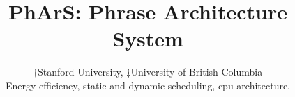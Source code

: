 \documentclass[9pt,journal,letterpaper,compsoc]{IEEEtran}
\begin{document}
\title{PhArS: Phrase Architecture System}


\author{%

$\dagger$Stanford University, $\ddagger$University of British Columbia


{\justifying
\begin{abstract} 
\end{abstract}
\par}

\begin{keywords}
Energy efficiency, static and dynamic scheduling, cpu architecture.
\end{keywords}}
\maketitle
\IEEEdisplaynotcompsoctitleabstractindextext
\IEEEpeerreviewmaketitle
\thispagestyle{empty}
\pagestyle{empty}




\vspace{-2mm}
\nocite{ref:static}


\end{document}
